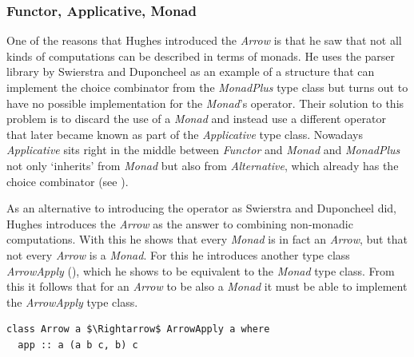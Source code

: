 \subsubsection{Functor, Applicative, Monad}
One of the reasons that Hughes introduced the \textit{Arrow} \cite{hughes2000-arrows} is that he saw that not all kinds of computations can be described in terms of monads. He uses the parser library by Swierstra and Duponcheel \cite{swierstra1996-parsers} as an example of a structure that can implement the choice combinator from the \textit{MonadPlus} type class but turns out to have no possible implementation for the \textit{Monad}'s \code{(>>=)} operator. Their solution to this problem is to discard the use of a \textit{Monad} and instead use a different operator \code{(<*>)} that later became known as part of the \textit{Applicative} type class. Nowadays \textit{Applicative} sits right in the middle between \textit{Functor} and \textit{Monad} and \textit{MonadPlus} not only `inherits' from \textit{Monad} but also from \textit{Alternative}, which already has the choice combinator (see ).

As an alternative to introducing the \code{(<*>)} operator as Swierstra and Duponcheel did, Hughes introduces the \textit{Arrow} as the answer to combining non-monadic computations. With this he shows that every \textit{Monad} is in fact an \textit{Arrow}, but that not every \textit{Arrow} is a \textit{Monad}. For this he introduces another type class \textit{ArrowApply} (), which he shows to be equivalent to the \textit{Monad} type class. From this it follows that for an \textit{Arrow} to be also a \textit{Monad} it must be able to implement the \textit{ArrowApply} type class.

\begin{lstlisting}[style=HaskellStyle, caption={\textit{ArrowApply} type class}, label={lst:arrow-apply}, captionpos=b, numbers=none]
class Arrow a $\Rightarrow$ ArrowApply a where
  app :: a (a b c, b) c
\end{lstlisting}

